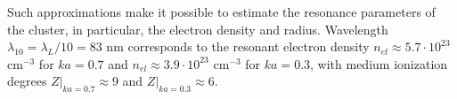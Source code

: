 Such approximations make it possible to estimate the resonance parameters of the cluster, in particular, the electron density and radius. Wavelength $\lambda_{10} = \lambda_{L} / 10 = 83$ nm corresponds to the resonant electron density $n_{el} \approx 5.7 \cdot 10^{23}$ $\textrm{cm}^{-3}$ for $ka = 0.7$ and $n_{el} \approx 3.9 \cdot 10^{23}$ $\textrm{cm}^{-3}$ for $ka = 0.3$, with medium ionization degrees $Z|_{ka = 0.7} \approx 9$ and $Z|_{ka = 0.3} \approx 6$.